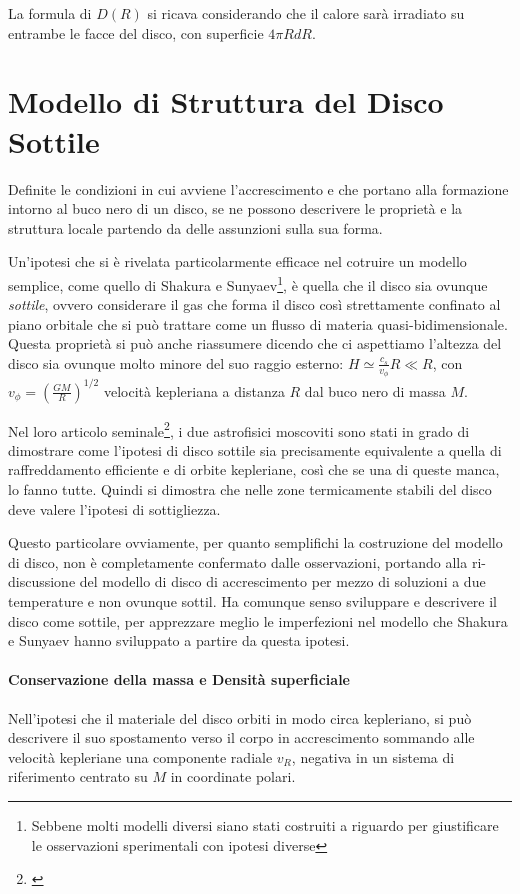 \documentclass[a4paperbi]{article}
\begin{document}
	La formula di $D(R)$ si ricava considerando che il calore sarà irradiato su entrambe le facce del disco, con superficie $4\pi RdR$.
	
\newpage
\section{Modello di Struttura del Disco Sottile}
	Definite le condizioni in cui avviene l'accrescimento e che portano alla formazione intorno al buco nero di un disco, se ne possono descrivere le proprietà e la struttura locale partendo da delle assunzioni sulla sua forma. 

	Un'ipotesi che si è rivelata particolarmente efficace nel cotruire un modello semplice, come quello di Shakura e Sunyaev\footnote{Sebbene molti modelli diversi siano stati costruiti a riguardo per giustificare le osservazioni sperimentali con ipotesi diverse}, è quella che il disco sia ovunque \textit{sottile}, ovvero considerare il gas che forma il disco così strettamente confinato al piano orbitale che si può trattare come un flusso di materia quasi-bidimensionale. Questa proprietà si può anche riassumere dicendo che ci aspettiamo l'altezza del disco sia ovunque molto minore del suo raggio esterno: $H\simeq\frac{c_s}{v_\phi}R\ll R$, con $v_\phi=\left(\frac{GM}{R}\right)^{1/2}$ velocità kepleriana a distanza $R$ dal buco nero di massa $M$.
	
	Nel loro articolo seminale\footnote{\cite{ShakuraSunyaev1973}}, i due astrofisici moscoviti sono stati in grado di dimostrare come l'ipotesi di disco sottile sia precisamente equivalente a quella di raffreddamento efficiente e di orbite kepleriane, così che se una di queste manca, lo fanno tutte. Quindi si dimostra che nelle zone termicamente stabili del disco deve valere l'ipotesi di sottigliezza.
	
	Questo particolare ovviamente, per quanto semplifichi la costruzione del modello di disco, non è completamente confermato dalle osservazioni, portando alla ri-discussione del modello di disco di accrescimento per mezzo di soluzioni a due temperature e non ovunque sottil. Ha comunque senso sviluppare e descrivere il disco come sottile, per apprezzare meglio le imperfezioni nel modello che Shakura e Sunyaev hanno sviluppato a partire da questa ipotesi.
		
	\paragraph{Conservazione della massa e Densità superficiale}
		Nell'ipotesi che il materiale del disco orbiti in modo circa kepleriano, si può descrivere il suo spostamento verso il corpo in accrescimento sommando alle velocità kepleriane una componente radiale $v_R$, negativa in un sistema di riferimento centrato su $M$ in coordinate polari.
\end{document}
